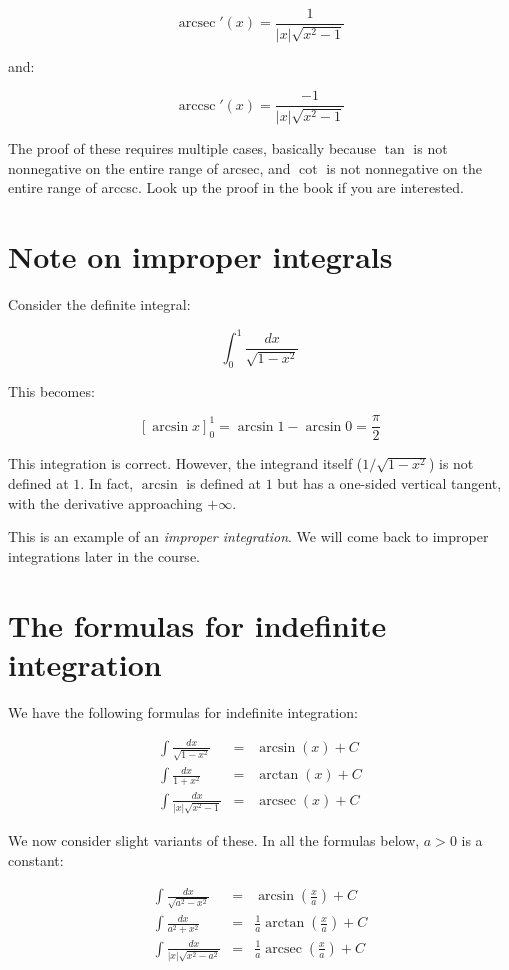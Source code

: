 \documentclass{amsart}
\begin{document}
$$\operatorname{arcsec}'(x) = \frac{1}{|x|\sqrt{x^2 - 1}}$$

and:

$$\operatorname{arccsc}'(x) = \frac{-1}{|x|\sqrt{x^2 - 1}}$$

The proof of these requires multiple cases, basically because $\tan$
is not nonnegative on the entire range of arcsec, and $\cot$ is not
nonnegative on the entire range of arccsc. Look up the proof in the
book if you are interested.

\section{Note on improper integrals}

Consider the definite integral:

$$\int_0^1 \frac{dx}{\sqrt{1 - x^2}}$$

This becomes:

$$[\arcsin x]_0^1 = \arcsin 1 - \arcsin 0 = \frac{\pi}{2}$$

This integration is correct. However, the integrand itself ($1/\sqrt{1
  - x^2}$) is not defined at $1$. In fact, $\arcsin$ is defined at $1$
but has a one-sided vertical tangent, with the derivative approaching
$+\infty$.

This is an example of an {\em improper integration}. We will come back
to improper integrations later in the course.
\section{The formulas for indefinite integration}

We have the following formulas for indefinite integration:

\begin{eqnarray*}
  \int \frac{dx}{\sqrt{1 - x^2}} & = & \arcsin(x) + C \\
  \int \frac{dx}{1 + x^2} & = & \arctan(x) + C\\
  \int \frac{dx}{|x|\sqrt{x^2 - 1}} & = & \operatorname{arcsec}(x) + C
\end{eqnarray*}

We now consider slight variants of these. In all the formulas below,
$a > 0$ is a constant:

\begin{eqnarray*}
  \int \frac{dx}{\sqrt{a^2 - x^2}} & = & \arcsin\left(\frac{x}{a}\right) + C\\
  \int \frac{dx}{a^2 + x^2} & = & \frac{1}{a} \arctan \left(\frac{x}{a}\right) + C\\
  \int \frac{dx}{|x|\sqrt{x^2 - a^2}} & = & \frac{1}{a} \operatorname{arcsec}\left(\frac{x}{a}\right) +C
\end{eqnarray*}
\end{document}
